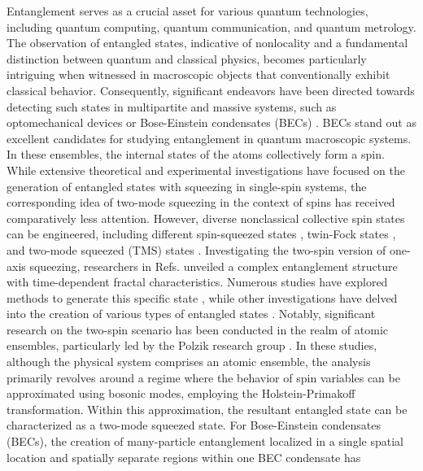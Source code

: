 \documentclass[
aps,%
12pt,%
final,%
notitlepage,%
oneside,%
onecolumn,%
nobibnotes,%
nofootinbib,%
superscriptaddress,%
noshowpacs,%
centertags]%
{revtex4}
\begin{document}
Entanglement serves as a crucial asset for various quantum technologies, including quantum computing, quantum communication, and quantum metrology. The observation of entangled states, indicative of nonlocality and a fundamental distinction between quantum and classical physics, becomes particularly intriguing when witnessed in macroscopic objects that conventionally exhibit classical behavior. Consequently, significant endeavors have been directed towards detecting such states in multipartite and massive systems, such as optomechanical devices \cite{Galland2014,SafaviNaeini2014} or Bose-Einstein condensates (BECs) \cite{Duan2000,Pu2000,pyrkov2013}. BECs stand out as excellent candidates for studying entanglement in quantum macroscopic systems. In these ensembles, the internal states of the atoms collectively form a spin. While extensive theoretical and experimental investigations have focused on the generation of entangled states with squeezing in single-spin systems, the corresponding idea of two-mode squeezing in the context of spins has received comparatively less attention. However, diverse nonclassical collective spin states can be engineered, including different spin-squeezed states \cite{kitagawa1993squeezed}, twin-Fock states \cite{Luecke2011}, and two-mode squeezed (TMS) states \cite{Baumgarten2008}. Investigating the two-spin version of one-axis squeezing, researchers in Refs. \cite{pyrkov2013,byrnes2013fractality} unveiled a complex entanglement structure with time-dependent fractal characteristics. Numerous studies have explored methods to generate this specific state \cite{pyrkov2013,2014Entanglement,kurkjian2013spin}, while other investigations have delved into the creation of various types of entangled states \cite{pettersson2017light,bec7}. Notably, significant research on the two-spin scenario has been conducted in the realm of atomic ensembles, particularly led by the Polzik research group \cite{julsgaard2001experimental,Krauter_2013}. In these studies, although the physical system comprises an atomic ensemble, the analysis primarily revolves around a regime where the behavior of spin variables can be approximated using bosonic modes, employing the Holstein-Primakoff transformation. Within this approximation, the resultant entangled state can be characterized as a two-mode squeezed state.  For Bose-Einstein condensates (BECs), the creation of many-particle entanglement localized in a single spatial location \cite{sorensen2001many,Augusto2014Fisher} and spatially separate regions \cite{kunkel2018spatially,lange2018entanglement,fadel2018spatial} within one BEC condensate has
\end{document}
